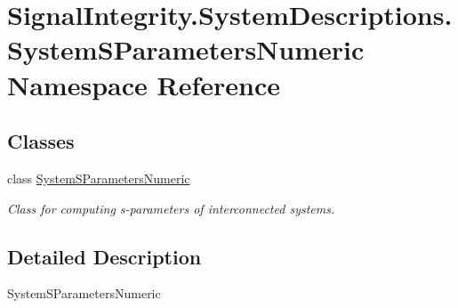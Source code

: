 \hypertarget{namespaceSignalIntegrity_1_1SystemDescriptions_1_1SystemSParametersNumeric}{}\section{Signal\+Integrity.\+System\+Descriptions.\+System\+S\+Parameters\+Numeric Namespace Reference}
\label{namespaceSignalIntegrity_1_1SystemDescriptions_1_1SystemSParametersNumeric}
\subsection*{Classes}
\begin{DoxyCompactItemize}
\item 
class \hyperlink{classSignalIntegrity_1_1SystemDescriptions_1_1SystemSParametersNumeric_1_1SystemSParametersNumeric}{System\+S\+Parameters\+Numeric}
\begin{DoxyCompactList}\small\item\em Class for computing s-\/parameters of interconnected systems. \end{DoxyCompactList}\end{DoxyCompactItemize}


\subsection{Detailed Description}
\begin{DoxyVerb}SystemSParametersNumeric\end{DoxyVerb}
 